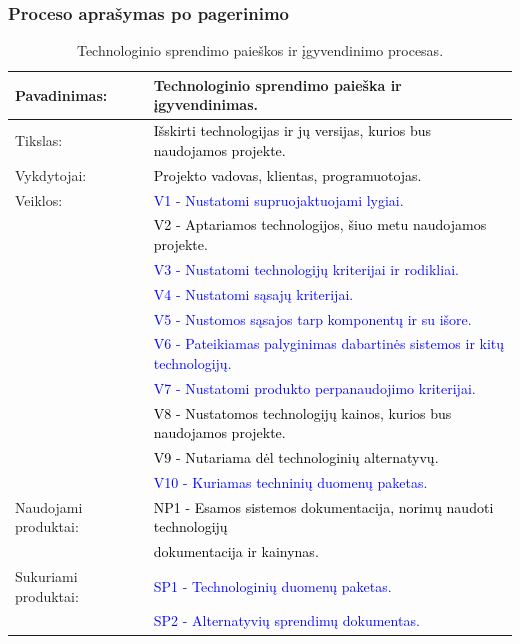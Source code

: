 \documentclass{VUMIFPSkursinis}
\begin{document}
			\subsubsection{Proceso aprašymas po pagerinimo}
			\begin{center}
		\begin{table}[ht]
			\caption{Technologinio sprendimo paieškos ir įgyvendinimo procesas.}
			\begin{tabular}{ | l | l | }
				\hline
				Pavadinimas:          & Technologinio sprendimo paieška ir įgyvendinimas.									\\ \hline
				Tikslas:              & \textcolor{black}{Išskirti technologijas ir jų versijas, kurios bus naudojamos projekte. 	}					\\ \hline
				Vykdytojai:           & \textcolor{black}{Projekto vadovas, klientas, programuotojas.}										\\ \hline
				Veiklos:              & \textcolor{blue}{V1 - Nustatomi supruojaktuojami lygiai.} 								\\
				& \textcolor{black}{V2 - Aptariamos technologijos, šiuo metu naudojamos projekte.} \\	
				& \textcolor{blue}{V3 - Nustatomi technologijų kriterijai ir rodikliai.} \\			
				& \textcolor{blue}{V4 - Nustatomi sąsajų kriterijai.} \\	
				& \textcolor{blue}{V5 - Nustomos sąsajos tarp komponentų ir su išore.} \\	
				& \textcolor{blue}{V6 - Pateikiamas palyginimas dabartinės sistemos ir kitų technologijų.} \\		
				& \textcolor{blue}{V7 - Nustatomi produkto perpanaudojimo kriterijai.} \\							
				                      & \textcolor{black}{V8 - Nustatomos technologijų kainos, kurios bus naudojamos projekte.}							\\
				                      & \textcolor{black}{V9 - Nutariama dėl technologinių alternatyvų.	}									\\ 
				                     
				& \textcolor{blue}{V10 - Kuriamas techninių duomenų paketas.} \\		\hline
				                      
				Naudojami produktai:	& \textcolor{black}{NP1 - Esamos sistemos dokumentacija, norimų naudoti technologijų} \\& \textcolor{black}{dokumentacija ir kainynas. 	}		\\ \hline
				Sukuriami produktai:	
				& \textcolor{blue}{SP1 - Technologinių duomenų paketas.}	\\
				& \textcolor{blue}{SP2 - Alternatyvių sprendimų dokumentas.}	\\\hline
			\end{tabular}
		\end{table}
	\end{center}
\end{document}

